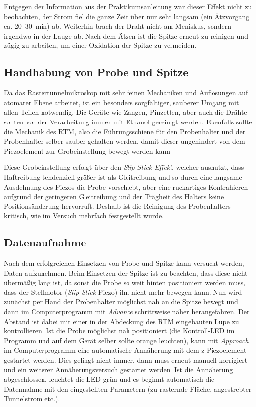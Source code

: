 \documentclass[10pt, a4paper]{article}
\begin{document}
Entgegen der Information aus der Praktikumsanleitung war dieser Effekt nicht zu beobachten, der Strom fiel die ganze Zeit über nur sehr langsam (ein Ätzvorgang ca. \num{20}--\SI{30}{\minute}) ab.
Weiterhin brach der Draht nicht am Meniskus, sondern irgendwo in der Lauge ab.  
Nach dem Ätzen ist die Spitze erneut zu reinigen und zügig zu arbeiten, um einer Oxidation der Spitze zu vermeiden.

\subsection{Handhabung von Probe und Spitze}

Da das Rastertunnelmikroskop mit sehr feinen Mechaniken und Auflösungen auf atomarer Ebene arbeitet, ist ein besonders sorgfältiger, sauberer Umgang mit allen Teilen notwendig.
Die Geräte wie Zangen, Pinzetten, aber auch die Drähte sollten vor der Verarbeitung immer mit Ethanol gereinigt werden.
Ebenfalls sollte die Mechanik des RTM, also die Führungsschiene für den Probenhalter und der Probenhalter selber sauber gehalten werden, damit dieser ungehindert von dem Piezoelement zur Grobeinstellung bewegt werden kann.

Diese Grobeinstellung erfolgt über den \emph{Slip-Stick-Effekt}, welcher ausnutzt, dass Haftreibung tendenziell größer ist als Gleitreibung und so durch eine langsame Ausdehnung des Piezos die Probe vorschiebt, aber eine ruckartiges Kontrahieren aufgrund der geringeren Gleitreibung und der Trägheit des Halters keine Positionsänderung hervorruft.
Deshalb ist die Reinigung des Probenhalters kritisch, wie im Versuch mehrfach festgestellt wurde.

\subsection{Datenaufnahme}

Nach dem erfolgreichen Einsetzen von Probe und Spitze kann versucht werden, Daten aufzunehmen.
Beim Einsetzen der Spitze ist zu beachten, dass diese nicht übermäßig lang ist, da sonst die Probe so weit hinten positioniert werden muss, dass der Stellmotor (\emph{Slip-Stick}-Piezo) ihn nicht mehr bewegen kann.
Nun wird zunächst per Hand der Probenhalter möglichst nah an die Spitze bewegt und dann im Computerprogramm mit \textit{Advance} schrittweise näher herangefahren.
Der Abstand ist dabei mit einer in der Abdeckung des RTM eingebauten Lupe zu kontrollieren.
Ist die Probe möglichst nah positioniert (die Kontroll-LED im Programm und auf dem Gerät selber sollte orange leuchten), kann mit \textit{Approach} im Computerprogramm eine automatische Annäherung mit dem z-Piezoelement gestartet werden.
Dies gelingt nicht immer, dann muss erneut manuell korrigiert und ein weiterer Annäherungsversuch gestartet werden.
Ist die Annäherung abgeschlossen, leuchtet die LED grün und es beginnt automatisch die Datennahme mit den eingestellten Parametern (zu rasternde Fläche, angestrebter Tunnelstrom etc.).
\end{document}
